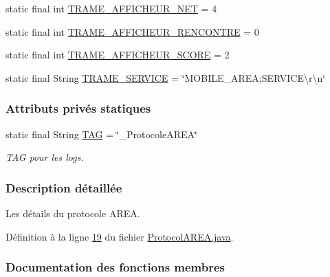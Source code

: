 \begin{DoxyCompactItemize}
\item 
static final int \hyperlink{classcom_1_1example_1_1area_1_1_protocol_a_r_e_a_a33bebef0a070831f8853b3f9e88532f2}{T\+R\+A\+M\+E\+\_\+\+A\+F\+F\+I\+C\+H\+E\+U\+R\+\_\+\+N\+ET} = 4
\item 
static final int \hyperlink{classcom_1_1example_1_1area_1_1_protocol_a_r_e_a_a6a896dcb5c52062dbeab426b93e566fc}{T\+R\+A\+M\+E\+\_\+\+A\+F\+F\+I\+C\+H\+E\+U\+R\+\_\+\+R\+E\+N\+C\+O\+N\+T\+RE} = 0
\item 
static final int \hyperlink{classcom_1_1example_1_1area_1_1_protocol_a_r_e_a_a63ba437bfc08504af2caaec99d61a230}{T\+R\+A\+M\+E\+\_\+\+A\+F\+F\+I\+C\+H\+E\+U\+R\+\_\+\+S\+C\+O\+RE} = 2
\item 
static final String \hyperlink{classcom_1_1example_1_1area_1_1_protocol_a_r_e_a_ab835cea072ee1568a285250debc1b3be}{T\+R\+A\+M\+E\+\_\+\+S\+E\+R\+V\+I\+CE} = \char`\"{}M\+O\+B\+I\+L\+E\+\_\+\+A\+R\+EA;S\+E\+R\+V\+I\+C\+E\textbackslash{}r\textbackslash{}n\char`\"{}
\end{DoxyCompactItemize}
\subsubsection*{Attributs privés statiques}
\begin{DoxyCompactItemize}
\item 
static final String \hyperlink{classcom_1_1example_1_1area_1_1_protocol_a_r_e_a_a4cc039bb2f3b605eb461b38dca05d22d}{T\+AG} = \char`\"{}\+\_\+\+Protocole\+A\+R\+EA\char`\"{}
\begin{DoxyCompactList}\small\item\em T\+AG pour les logs. \end{DoxyCompactList}\end{DoxyCompactItemize}


\subsubsection{Description détaillée}
Les détails du protocole A\+R\+EA. 

Définition à la ligne \hyperlink{_protocol_a_r_e_a_8java_source_l00019}{19} du fichier \hyperlink{_protocol_a_r_e_a_8java_source}{Protocol\+A\+R\+E\+A.\+java}.



\subsubsection{Documentation des fonctions membres}
\mbox{\label{classcom_1_1example_1_1area_1_1_protocol_a_r_e_a_a3d4245d57e6b03b022e72c3ab9b2bc34}} 
